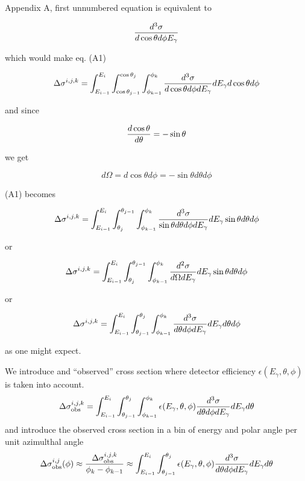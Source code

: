 \documentclass{article}
\begin{document}
Appendix A, first unnumbered equation is equivalent to 

\begin{equation}
      {d^3\sigma \over d\cos\theta d\phi E_\gamma}
\end{equation}

which would make eq. (A1)

\begin{equation}\Delta\sigma^{i,j,k} = \int^{E_i}_{E_{i-1}}\int^{\cos\theta_j}_{\cos\theta_{j-1}}\int^{\phi_k}_{\phi_{k-1}} {d^3\sigma \over d\cos\theta d\phi dE_\gamma}dE_\gamma d\cos\theta d\phi\end{equation}

and since

\begin{equation}{d\cos\theta \over d\theta} = -\sin\theta\end{equation}

we get

\begin{equation} d\Omega = d\cos\theta d\phi = -\sin\theta d\theta d\phi \end{equation}

(A1) becomes

\begin{equation}\Delta\sigma^{i,j,k} = \int^{E_i}_{E_{i-1}}\int_{\theta_j}^{\theta_{j-1}}\int^{\phi_k}_{\phi_{k-1}} {d^3\sigma \over \sin\theta d\theta d\phi dE_\gamma} dE_\gamma \sin\theta d\theta d\phi\end{equation}

or

\begin{equation}\Delta\sigma^{i,j,k} = \int^{E_i}_{E_{i-1}}\int_{\theta_j}^{\theta_{j-1}}\int^{\phi_k}_{\phi_{k-1}} {d^2\sigma \over d\Omega dE_\gamma} dE_\gamma \sin\theta d\theta d\phi\end{equation}

or

\begin{equation}\Delta\sigma^{i,j,k} = \int^{E_i}_{E_{i-1}}\int_{\theta_{j-1}}^{\theta_j}\int^{\phi_k}_{\phi_{k-1}} {d^3\sigma \over d\theta d\phi dE_\gamma} dE_\gamma d\theta d\phi\end{equation}

as one might expect.

We introduce and ``observed'' cross section where detector efficiency $\epsilon(E_\gamma,\theta,\phi)$ is taken into account.
\begin{equation}
\Delta\sigma^{i,j,k}_{\rm obs} = \int^{E_i}_{E_{i-1}}\int_{\theta_{j-1}}^{\theta_j}\int^{\phi_k}_{\phi_{k-1}} \epsilon(E_\gamma,\theta,\phi) {d^3\sigma \over d\theta d\phi dE_\gamma} dE_\gamma d\theta
\end{equation}
and introduce the observed cross section in a bin of energy and polar angle per unit azimulthal angle
\begin{equation}
\Delta\sigma^{i,j}_{\rm obs}(\phi) \approx {\Delta\sigma^{i,j,k}_{\rm obs} \over \phi_k - \phi_{k-1}} \approx \int^{E_i}_{E_{i-1}}\int_{\theta_{j-1}}^{\theta_j} \epsilon(E_\gamma,\theta,\phi) {d^3\sigma \over d\theta d\phi dE_\gamma} dE_\gamma d\theta\end{equation}
\end{document}
